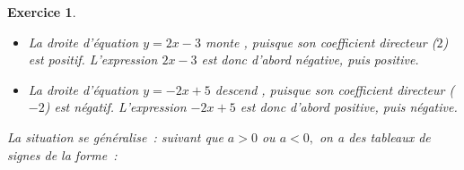 \documentclass[10pt]{article}
\newtheorem{exo}{Exercice}
\begin{document}
\begin{exo}
\begin{enumerate}
\begin{itemize}
\begin{multicols}{2}


\begin{align*}
2x-3&=0\\
2x-\cancel{3}+\cancel{3}&=0+3\\
\frac{\cancel{2}x}{\cancel{2}}&=\frac{3}{2}\\
x&=1,5
\end{align*}

\columnbreak

\begin{align*}
-2x+5&=0\\
-2x+\cancel{5}-\cancel{5}&=0-5\\
\frac{\cancel{-2}x}{\cancel{-2}}&=\frac{-5}{-2}\\
x&=2,5
\end{align*}

\end{multicols}


\item[\textbullet] La droite d'équation $y=2x-3$ \og monte \fg, puisque son coefficient directeur ($2$) est positif. L'expression $2x-3$ est donc d'abord négative, puis positive.
\item[\textbullet] La droite d'équation $y=-2x+5$ \og descend \fg, puisque son coefficient directeur ($-2$) est négatif. L'expression $-2x+5$ est donc d'abord positive, puis négative.
\end{itemize}

\medskip

La situation se généralise~: suivant que $a>0$ ou $a<0,$ on a des tableaux de signes de la forme~:

\begin{multicols}{2}



\begin{center}


\end{center}

\columnbreak



\begin{center}


\end{center}


\end{multicols}
\end{enumerate}
\end{exo}
\end{document}
